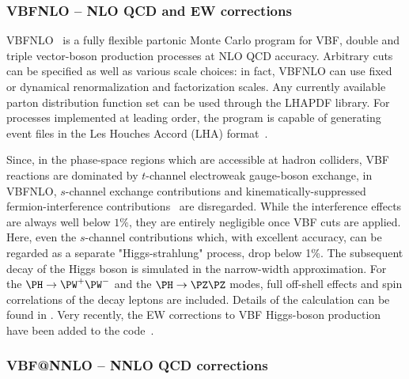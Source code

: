\subsubsection{VBFNLO -- NLO QCD and EW corrections}
\label{sec:VBFNLO}
{\sc VBFNLO}~\cite{webVBFNLO} is a fully flexible partonic Monte Carlo
program for VBF, double and triple vector-boson production processes at NLO
QCD accuracy.  Arbitrary cuts can be specified as well as various scale
choices: in fact, {\sc VBFNLO} can use fixed or dynamical renormalization and
factorization scales. Any currently available parton distribution function
set can be used through the LHAPDF library.  For processes implemented at
leading order, the program is capable of generating event files in the Les
Houches Accord (LHA) format~\cite{Alwall:2006yp}.

Since, in the phase-space regions which are accessible at hadron colliders,
VBF reactions are dominated by $t$-channel electroweak gauge-boson exchange,
in {\sc VBFNLO}, $s$-channel exchange contributions and
kinematically-suppressed fermion-interference
contributions~\cite{Andersen:2007mp,Bredenstein:2008tm} are disregarded. 
While the interference
effects are always well below $1\%$, they are entirely negligible once VBF
cuts are applied. Here, even the $s$-channel contributions which, with
excellent accuracy, can be regarded as a separate "Higgs-strahlung" process, drop below 1\%.
The subsequent decay of the Higgs boson is simulated in the narrow-width
approximation.  For the $\PH\to \PW^+\PW^- $ and the $\PH\to \PZ\PZ$ modes,
full off-shell effects and spin correlations of the decay leptons are
included.  Details of the calculation can be found in
.  Very recently, the EW corrections to VBF
Higgs-boson production have been added to the code~\cite{Figy:2010ct}.


\subsubsection{VBF@NNLO -- NNLO QCD corrections}
\label{sec:VBF-NNLO}


